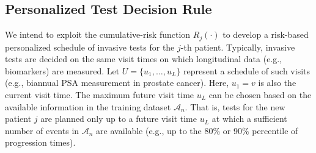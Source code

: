 \subsection{Personalized Test Decision Rule} 
\label{subsec:pers_schedule}
We intend to exploit the cumulative-risk function $R_j(\cdot)$ to develop a risk-based personalized schedule of invasive tests for the $j$-th patient. Typically, invasive tests are decided on the same visit times on which longitudinal data (e.g., biomarkers) are measured. Let $U = \{u_1, \ldots, u_L\}$ represent a schedule of such visits (e.g., biannual PSA measurement in prostate cancer).  Here, $u_1 = v$ is also the current visit time. The maximum future visit time $u_L$ can be chosen based on the available information in the training dataset $\mathcal A_n$. That is, tests for the new patient $j$ are planned only up to a future visit time $u_L$ at which a sufficient number of events in $\mathcal A_n$ are available (e.g., up to the 80\% or 90\% percentile of progression times).

